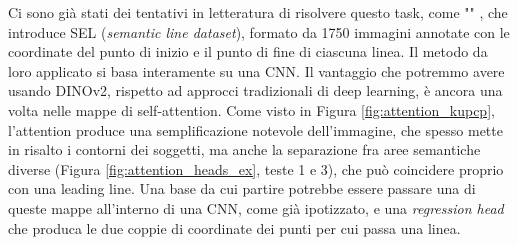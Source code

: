 Ci sono già stati dei tentativi in letteratura di risolvere questo task, come "\textit{}" \cite{sel}, che introduce SEL (\textit{semantic line dataset}), formato da 1750 immagini annotate con le coordinate del punto di inizio e il punto di fine di ciascuna linea. Il metodo da loro applicato si basa interamente su una CNN. Il vantaggio che potremmo avere usando DINOv2, rispetto ad approcci tradizionali di deep learning, è ancora una volta nelle mappe di self-attention. Come visto in Figura \ref{fig:attention_kupcp}, l'attention produce una semplificazione notevole dell'immagine, che spesso mette in risalto i contorni dei soggetti, ma anche la separazione fra aree semantiche diverse (Figura \ref{fig:attention_heads_ex}, teste 1 e 3), che può coincidere proprio con una leading line. Una base da cui partire potrebbe essere passare una di queste mappe all'interno di una CNN, come già ipotizzato, e una \textit{regression head} che produca le due coppie di coordinate dei punti per cui passa una linea.